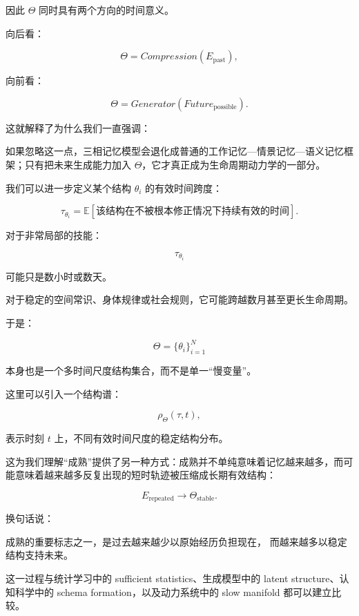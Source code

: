 因此 $\Theta$ 同时具有两个方向的时间意义。

向后看：

\[
\Theta
=
Compression(E_{\mathrm{past}}),
\]

向前看：

\[
\Theta
=
Generator(Future_{\mathrm{possible}}).
\]

这就解释了为什么我们一直强调：

\begin{statementbox}
\centering
{}
\end{statementbox}

如果忽略这一点，三相记忆模型会退化成普通的工作记忆—情景记忆—语义记忆框架；只有把未来生成能力加入 $\Theta$，它才真正成为生命周期动力学的一部分。

我们可以进一步定义某个结构 $\theta_i$ 的有效时间跨度：

\[
\tau_{\theta_i}
=
\mathbb{E}
\left[
\text{该结构在不被根本修正情况下持续有效的时间}
\right].
\]

对于非常局部的技能：

\[
\tau_{\theta_i}
\]

可能只是数小时或数天。

对于稳定的空间常识、身体规律或社会规则，它可能跨越数月甚至更长生命周期。

于是：

\[
\Theta
=
\{\theta_i\}_{i=1}^{N}
\]

本身也是一个多时间尺度结构集合，而不是单一“慢变量”。

这里可以引入一个结构谱：

\[
\rho_{\Theta}(\tau,t),
\]

表示时刻 $t$ 上，不同有效时间尺度的稳定结构分布。

这为我们理解“成熟”提供了另一种方式：成熟并不单纯意味着记忆越来越多，而可能意味着越来越多反复出现的短时轨迹被压缩成长期有效结构：

\[
E_{\mathrm{repeated}}
\rightarrow
\Theta_{\mathrm{stable}}.
\]

换句话说：

\begin{statementbox}
成熟的重要标志之一，是过去越来越少以原始经历负担现在，
而越来越多以稳定结构支持未来。
\end{statementbox}

这一过程与统计学习中的 sufficient statistics、生成模型中的 latent structure、认知科学中的 schema formation，以及动力系统中的 slow manifold 都可以建立比较。

